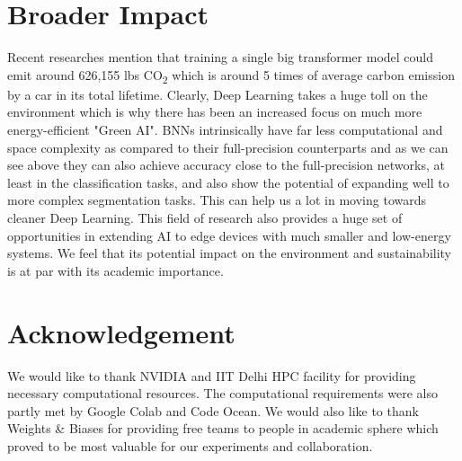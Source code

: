 \section*{Broader Impact}
Recent researches \cite{r3} mention that training a single big transformer model could emit around 626,155 lbs CO\textsubscript{2} which is around 5 times of average carbon emission by a car in its total lifetime. Clearly, Deep Learning takes a huge toll on the environment which is why there has been an increased focus on much more energy-efficient "Green AI". BNNs intrinsically have far less computational and space complexity as compared to their full-precision counterparts and as we can see above they can also achieve accuracy close to the full-precision networks, at least in the classification tasks, and also show the potential of expanding well to more complex segmentation tasks. This can help us a lot in moving towards cleaner Deep Learning. This field of research also provides a huge set of opportunities in extending AI to edge devices with much smaller and low-energy systems. We feel that its potential impact on the environment and sustainability is at par with its academic importance.

\section*{Acknowledgement}
We would like to thank NVIDIA and IIT Delhi HPC facility for providing necessary computational resources. The computational requirements were also partly met by Google Colab and Code Ocean. We would also like to thank Weights \& Biases for providing free teams to people in academic sphere which proved to be most valuable for our experiments and collaboration.
